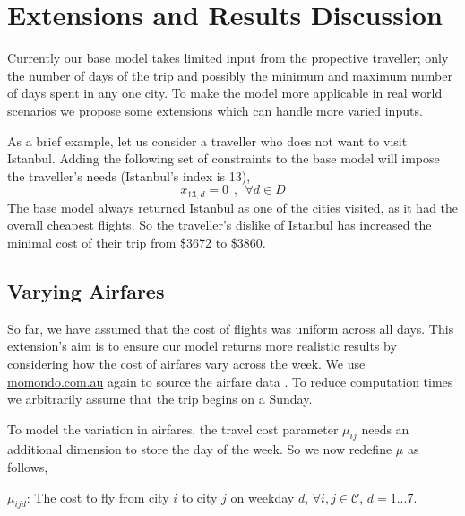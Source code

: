 \documentclass[12pt]{article}
\begin{document}

\section{Extensions and Results Discussion} 
\label{sec:extensions}


Currently our base model takes limited input from the propective traveller; only the number of days of the trip and possibly the minimum and maximum number of days spent in any one city. To make the model more applicable in real world scenarios we propose some extensions which can handle more varied inputs.

As a brief example, let us consider a traveller who does not want to visit Istanbul. Adding the following set of constraints to the base model will impose the traveller's needs (Istanbul's index is 13),
$$	x_{13,d} = 0~~,~~ \forall d \in D	$$
The base model always returned Istanbul as one of the cities visited, as it had the overall cheapest flights. So the traveller's dislike of Istanbul has increased the minimal cost of their trip from \$3672 to \$3860.

\subsection{Varying Airfares}
So far, we have assumed that the cost of flights was uniform across all days. This extension's aim is to ensure our model returns more realistic results by considering how the cost of airfares vary across the week. We use \url{momondo.com.au} again to source the airfare data \cite{momondo}. To reduce computation times we arbitrarily assume that the trip begins on a Sunday.

To model the variation in airfares, the travel cost parameter $\mu_{ij}$ needs an additional dimension to store the day of the week. So we now redefine $\mu$ as follows,

$\mu_{ijd}$: The cost to fly from city $i$ to city $j$ on weekday $d$, $\forall i,j \in \mathcal{C}$, $d=1...7$.
\end{document}
